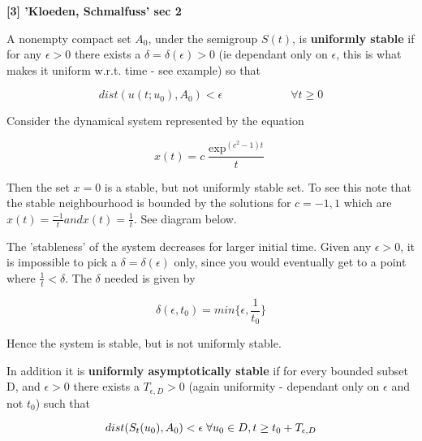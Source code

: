 \begin{defn}

  {\bf [3] 'Kloeden, Schmalfuss' sec 2}

  A nonempty compact set $A_{0}$, under the semigroup $S(t)$, is {\bf
  uniformly stable} if for any $\epsilon > 0$ there exists a $\delta = \delta
  ( \epsilon) > 0$ (ie dependant only on $\epsilon$, this is what makes it
  uniform w.r.t. time - see example) so that

  \[ dist(u(t;u_{0}),A_{0}) < \epsilon \hspace{1in} \forall t \geq 0 \]

\begin{eg}
  Consider the dynamical system represented by the equation

\[ x(t) = c \frac{\exp^{(c^{2} - 1)t}}{t} \]

Then the set $x = 0$ is a stable, but not uniformly stable set. To see this
note that the stable neighbourhood is bounded by the solutions for $c=-1,1$
which are $x(t) = \frac{-1}{t} and x(t) = \frac{1}{t}$. See diagram below.

\vspace{10cm}

The 'stableness' of the system decreases for larger initial time. Given any
$\epsilon > 0$, it is impossible to pick a $\delta = \delta(\epsilon)$ only,
since you would eventually get to a point where $\frac{1}{t} < \delta$. The
$\delta$ needed is given by

\[ \delta(\epsilon,t_{0}) = min \{ \epsilon, \frac{1}{t_{0}} \} \]

Hence the system is stable, but is not uniformly stable.

\end{eg}

  In addition it is {\bf uniformly asymptotically stable} if for
  every bounded subset D, and $\epsilon > 0$ there exists a $T_{\epsilon,D} >
  0$ (again uniformity - dependant only on $\epsilon$ and not $t_{0}$) such
  that

  \[ dist(S_{t}(u_{0}),A_{0}) < \epsilon \hspace{1mm} \forall u_{0} \in D, t
   		\geq t_{0} + T_{\epsilon,D} \]
\end{defn}

